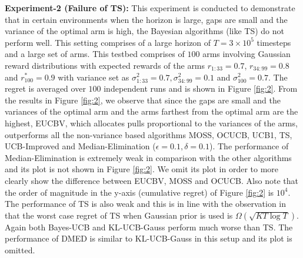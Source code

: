 \textbf{Experiment-2 (Failure of TS):} This experiment is conducted to demonstrate that in certain environments when the horizon is large, gaps are small and the variance of the optimal arm is high, the Bayesian algorithms (like TS) do not perform well. This setting comprises of a large horizon of $T = 3\times 10^{5}$ timesteps and a large set of arms. This testbed comprises of $100$ arms involving Gaussian reward distributions with expected rewards of the arms $r_{1:33}=0.7$, $r_{34:99}=0.8$ and $r^{*}_{100}=0.9$ with variance set as $\sigma_{1:33}^{2} = 0.7,\sigma_{34:99}^{2} = 0.1$ and $\sigma^{2}_{100}=0.7$. The regret is averaged over $100$ independent runs and is shown in Figure \ref{fig:2}. From the results in Figure \ref{fig:2}, we observe that since the gaps are small and the variances of the optimal arm and the arms farthest from the optimal arm are the highest, EUCBV, which allocates pulls proportional to the variances of the arms,  outperforms all the non-variance based algorithms MOSS, OCUCB, UCB1, TS, UCB-Improved and Median-Elimination ($\epsilon=0.1,\delta=0.1$). The performance of Median-Elimination is extremely weak in comparison with the other algorithms and its plot is not shown in Figure \ref{fig:2}. We omit its plot in order to more clearly show the difference between EUCBV, MOSS and OCUCB. Also note that the order of magnitude in the y-axis (cumulative regret) of Figure \ref{fig:2} is $10^4$. The performance of TS is also weak and this is in line with the observation in  \cite{lattimore2015optimally} that the worst case regret of TS when Gaussian prior is used is $\Omega\left( \sqrt{KT\log T}\right)$. Again both Bayes-UCB and KL-UCB-Gauss perform much worse than TS. The performance of DMED is similar to KL-UCB-Gauss in this setup and its plot is omitted. 


